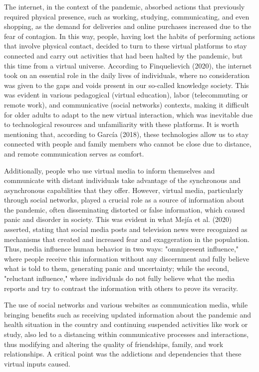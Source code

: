 \documentclass{article}
\begin{document}
The internet, in the context of the pandemic, absorbed actions that previously required physical presence, such as working, studying, communicating, and even shopping, as the demand for deliveries and online purchases increased due to the fear of contagion. In this way, people, having lost the habits of performing actions that involve physical contact, decided to turn to these virtual platforms to stay connected and carry out activities that had been halted by the pandemic, but this time from a virtual universe. According to Finquelievich (2020), the internet took on an essential role in the daily lives of individuals, where no consideration was given to the gaps and voids present in our so-called knowledge society. This was evident in various pedagogical (virtual education), labor (telecommuting or remote work), and communicative (social networks) contexts, making it difficult for older adults to adapt to the new virtual interaction, which was inevitable due to technological resources and unfamiliarity with these platforms. It is worth mentioning that, according to García (2018), these technologies allow us to stay connected with people and family members who cannot be close due to distance, and remote communication serves as comfort.

Additionally, people who use virtual media to inform themselves and communicate with distant individuals take advantage of the synchronous and asynchronous capabilities that they offer. However, virtual media, particularly through social networks, played a crucial role as a source of information about the pandemic, often disseminating distorted or false information, which caused panic and disorder in society. This was evident in what Mejía et al. (2020) asserted, stating that social media posts and television news were recognized as mechanisms that created and increased fear and exaggeration in the population. Thus, media influence human behavior in two ways: "omnipresent influence," where people receive this information without any discernment and fully believe what is told to them, generating panic and uncertainty; while the second, "reluctant influence," where individuals do not fully believe what the media reports and try to contrast the information with others to prove its veracity.

The use of social networks and various websites as communication media, while bringing benefits such as receiving updated information about the pandemic and health situation in the country and continuing suspended activities like work or study, also led to a distancing within communicative processes and interactions, thus modifying and altering the quality of friendships, family, and work relationships. A critical point was the addictions and dependencies that these virtual inputs caused.
\end{document}

